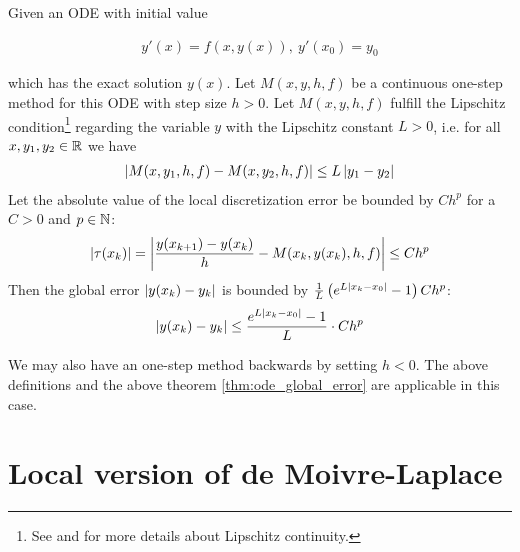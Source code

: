 \begin{theorem} \label{thm:ode_global_error}
  Given an ODE with initial value

  \begin{align}
    y'(x)=f(x,y(x)),\ y'(x_0)=y_0
  \end{align}

  which has the exact solution $y(x)$. Let $M(x,y,h,f)$ be a continuous one-step method for this ODE with step size $h > 0$. Let $M(x,y,h,f)$ fulfill the Lipschitz condition\footnote{See \cite[p. 467]{stoer} and \cite{wiki:lipschitz} for more details about Lipschitz continuity.} regarding the variable $y$ with the Lipschitz constant $L > 0$, i.e. for all $x,y_1,y_2\in\mathbb R$ we have
  \begin{align}
    \left|{M(x,y_1,h,f)-M(x,y_2,h,f)}\right| \le L \left|{y_1-y_2}\right|
  \end{align}
  Let the absolute value of the local discretization error be bounded by $C h^p$ for a $C > 0$ and $p\in \mathbb N$:
  \begin{align}
    \left|{\tau(x_k)}\right| = \left|{\frac{y(x_{k+1})-y(x_k)}h - M(x_k,y(x_k),h,f)}\right| \le Ch^p
  \end{align}
  Then the global error $\left|{y(x_k)-y_k}\right|$ is bounded by $\frac 1L \left( {e^{L\left|{x_k-x_0}\right|}-1} \right) C h^p$:
  \begin{align}
    \left|{y(x_k)-y_k}\right| \le \frac{e^{L\left|{x_k-x_0}\right|}-1}{L} \cdot Ch^p
  \end{align}
\end{theorem}

We may also have an one-step method backwards by setting $h < 0$. The above definitions and the  above theorem \ref{thm:ode_global_error} are applicable in this case.

\section{Local version of de Moivre-Laplace}

